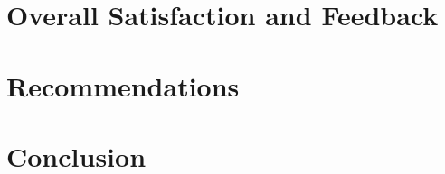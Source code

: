 \documentclass[12pt, titlepage]{article}
\begin{document}
\section{Overall Satisfaction and Feedback}

\section{Recommendations}

\section{Conclusion}

\newpage{}
\end{document}
